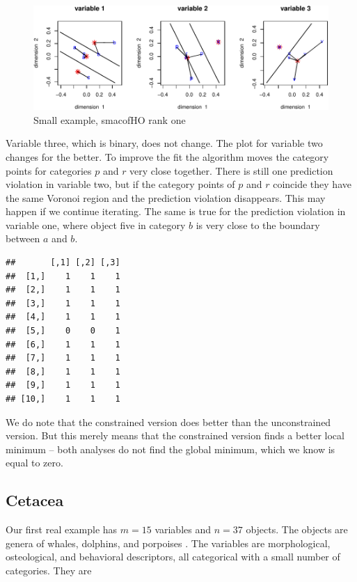 \documentclass[
  12pt,
]{article}
\begin{document}
\begin{figure}

{\centering \includegraphics{smacofHO_files/figure-latex/smallplot10-1} 

}

\caption{Small example, smacofHO rank one}\label{fig:smallplot10}
\end{figure}

Variable three, which is binary, does not change. The plot for variable two changes for the better. To improve the fit the algorithm moves the
category points for categories \(p\) and \(r\) very close together. There is
still one prediction violation in variable two, but
if the category points of \(p\) and \(r\) coincide they have the same Voronoi
region and the prediction violation disappears. This may happen if we
continue iterating. The same is true for the prediction violation in
variable one, where object five in category \(b\) is very close to the
boundary between \(a\) and \(b\).

\begin{verbatim}
##       [,1] [,2] [,3]
##  [1,]    1    1    1
##  [2,]    1    1    1
##  [3,]    1    1    1
##  [4,]    1    1    1
##  [5,]    0    0    1
##  [6,]    1    1    1
##  [7,]    1    1    1
##  [8,]    1    1    1
##  [9,]    1    1    1
## [10,]    1    1    1
\end{verbatim}

We do note that the constrained version does better than the
unconstrained version. But this merely means that the constrained
version finds a better local minimum -- both analyses do not
find the global minimum, which we know is equal to zero.

\subsection{Cetacea}\label{cetacea}

Our first real example has \(m=15\) variables and \(n=37\) objects. The
objects are genera of whales, dolphins, and porpoises . The variables are morphological, osteological, and behavioral descriptors,
all categorical with a small number of categories. They are
\end{document}

